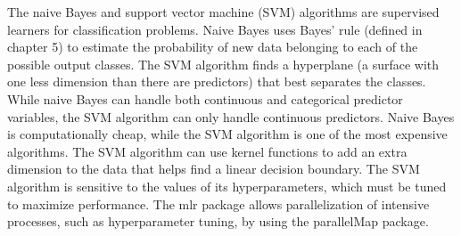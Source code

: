 \documentclass[
]{article}
\begin{document}
The naive Bayes and support vector machine (SVM) algorithms are
supervised learners for classification problems. Naive Bayes uses Bayes'
rule (defined in chapter 5) to estimate the probability of new data
belonging to each of the possible output classes. The SVM algorithm
finds a hyperplane (a surface with one less dimension than there are
predictors) that best separates the classes. While naive Bayes can
handle both continuous and categorical predictor variables, the SVM
algorithm can only handle continuous predictors. Naive Bayes is
computationally cheap, while the SVM algorithm is one of the most
expensive algorithms. The SVM algorithm can use kernel functions to add
an extra dimension to the data that helps find a linear decision
boundary. The SVM algorithm is sensitive to the values of its
hyperparameters, which must be tuned to maximize performance. The mlr
package allows parallelization of intensive processes, such as
hyperparameter tuning, by using the parallelMap package.
\end{document}
